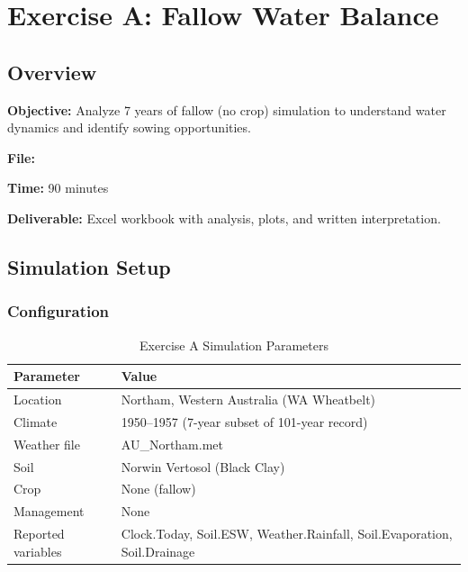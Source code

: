 
\chapter{Exercise A: Fallow Water Balance}
\label{ch:exercise-a}

\section{Overview}

\textbf{Objective:} Analyze 7 years of fallow (no crop) simulation to understand water dynamics and identify sowing opportunities.

\textbf{File:} 

\textbf{Time:} 90 minutes

\textbf{Deliverable:} Excel workbook with analysis, plots, and written interpretation.

\section{Simulation Setup}

\subsection{Configuration}

\begin{table}[H]
\centering
\caption{Exercise A Simulation Parameters}
\label{tab:exercise-a-setup}
\begin{tabularx}{\textwidth}{l|X}
\toprule
\textbf{Parameter} & \textbf{Value} \\
\midrule
Location & Northam, Western Australia (WA Wheatbelt) \\
Climate & 1950--1957 (7-year subset of 101-year record) \\
Weather file & AU\_Northam.met \\
Soil & Norwin Vertosol (Black Clay) \\
Crop & None (fallow) \\
Management & None \\
Reported variables & Clock.Today, Soil.ESW, Weather.Rainfall, Soil.Evaporation, Soil.Drainage \\
\bottomrule
\end{tabularx}
\end{table}


